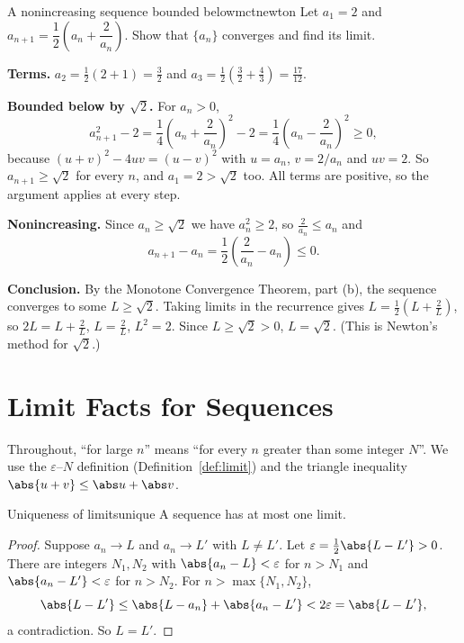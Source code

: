 \documentclass[11pt]{article}
\begin{document}
\begin{exmp}{A nonincreasing sequence bounded below}{mctnewton}
Let $a_1=2$ and $a_{n+1}=\dfrac12\left(a_n+\dfrac2{a_n}\right)$. Show that $\{a_n\}$ converges and find its limit.

\textbf{Terms.} $a_2=\frac12\left(2+1\right)=\frac32$ and $a_3=\frac12\left(\frac32+\frac43\right)=\frac{17}{12}$.

\textbf{Bounded below by $\sqrt2$.} For $a_n>0$,
\[
a_{n+1}^2-2=\frac14\left(a_n+\frac2{a_n}\right)^2-2=\frac14\left(a_n-\frac2{a_n}\right)^2\ge0 ,
\]
because $\left(u+v\right)^2-4uv=(u-v)^2$ with $u=a_n$, $v=2/a_n$ and $uv=2$. So $a_{n+1}\ge\sqrt2$ for every $n$, and $a_1=2>\sqrt2$ too. All terms are positive, so the argument applies at every step.

\textbf{Nonincreasing.} Since $a_n\ge\sqrt2$ we have $a_n^2\ge2$, so $\frac2{a_n}\le a_n$ and
\[
a_{n+1}-a_n=\frac12\left(\frac2{a_n}-a_n\right)\le0 .
\]

\textbf{Conclusion.} By the Monotone Convergence Theorem, part (b), the sequence converges to some $L\ge\sqrt2$. Taking limits in the recurrence gives $L=\frac12\left(L+\frac2L\right)$, so $2L=L+\frac2L$, $L=\frac2L$, $L^2=2$. Since $L\ge\sqrt2>0$, $L=\sqrt2$. (This is Newton's method for $\sqrt2$.)
\end{exmp}

\section{Limit Facts for Sequences}

Throughout, ``for large $n$'' means ``for every $n$ greater than some integer $N$''. We use the $\varepsilon$--$N$ definition (Definition~\ref{def:limit}) and the triangle inequality $\abs{u+v}\le\abs u+\abs v$.

\begin{thm}{Uniqueness of limits}{unique}
A sequence has at most one limit.
\end{thm}
\begin{proof}
Suppose $a_n\to L$ and $a_n\to L'$ with $L\ne L'$. Let $\varepsilon=\frac12\abs{L-L'}>0$. There are integers $N_1,N_2$ with $\abs{a_n-L}<\varepsilon$ for $n>N_1$ and $\abs{a_n-L'}<\varepsilon$ for $n>N_2$. For $n>\max\{N_1,N_2\}$,
\[
\abs{L-L'}\le\abs{L-a_n}+\abs{a_n-L'}<2\varepsilon=\abs{L-L'},
\]
a contradiction. So $L=L'$.
\end{proof}
\end{document}
